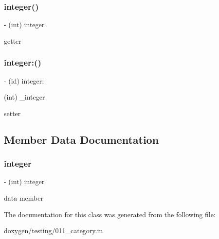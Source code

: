 \subsubsection{\texorpdfstring{integer()}{integer()}}
{\footnotesize\ttfamily -\/ (int) integer \begin{DoxyParamCaption}{ }\end{DoxyParamCaption}}

getter \mbox{\label{interface_integer_ad2f47761103b2442ff7b3fbfe33ec6c9}} 
\subsubsection{\texorpdfstring{integer:()}{integer:()}}
{\footnotesize\ttfamily -\/ (id) integer\+: \begin{DoxyParamCaption}\item[{(int)}]{\+\_\+integer }\end{DoxyParamCaption}}

setter 

\subsection{Member Data Documentation}
\mbox{\label{interface_integer_a35e89216966d8179a1b77f14b8211fda}} 
\subsubsection{\texorpdfstring{integer}{integer}}
{\footnotesize\ttfamily -\/ (int) integer\hspace{0.3cm}{\ttfamily [protected]}}

data member 

The documentation for this class was generated from the following file\+:\begin{DoxyCompactItemize}
\item 
doxygen/testing/011\+\_\+category.\+m\end{DoxyCompactItemize}
